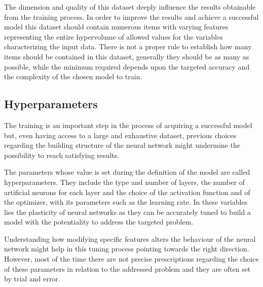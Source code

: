\documentclass[a4paper,10pt]{report}
\begin{document}
The dimension and quality of this 
dataset deeply influence the results obtainable from the training process.
In order to improve the results and achieve a successful model 
this dataset should contain numerous items with varying features
representing the entire hypervolume of allowed values for the variables
characterizing the input data.
There is not a proper rule to establish how many items should be contained 
in this dataset, generally they should be as many as possible, while 
the minimum required depends upon the targeted accuracy and the complexity of
the chosen model to train.


\subsection{Hyperparameters}

The training is an important step in the process of acquiring a successful model but, even
having access to a large and exhaustive dataset, previous choices regarding the 
building structure of the neural network might undermine the possibility to reach
satisfying results.

The parameters whose value is set during the definition of the model are called hyperparameters.
They include the type and number of layers, the number of artificial neurons for each layer and
the choice of the activation function and of the optimizer, with
its parameters such as the learning rate. In these variables lies the plasticity of neural networks as
they can be accurately tuned to build a model with the potentiality 
to address the targeted problem.

Understanding how modifying specific features alters the behaviour of the neural 
network might help in this tuning process pointing towards the right direction.
However, most of the time there are not precise prescriptions regarding the choice of these parameters
in relation to the addressed problem and they are often set by trial and error.
\end{document}
